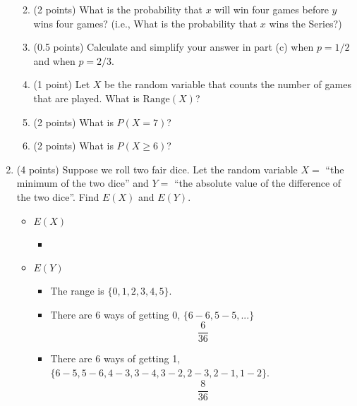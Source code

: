 \documentclass[11pt]{article}
\newcommand{\Range}{{\mathrm{Range}}}
\begin{document}
\begin{enumerate}
\begin{enumerate}
\begin{itemize}
	\end{itemize}
	
	\item (2 points) What is the probability that $x$ will win four games before
	$y$ wins four games?  (i.e., What is the probability that $x$ wins
	the Series?)
	
	
	
	\item (0.5 points) Calculate and simplify your answer in part (c) when $p=1/2$
	and when $p=2/3$.
	
	\item (1 point) Let $X$ be the random variable that counts the number of games
	that are played.  What is $\Range(X)$?
	
	\item (2 points) What is $P(X=7)$?
	
	\item (2 points) What is $P(X\geq 6)$?
\end{enumerate}

\item (4 points) Suppose we roll two fair dice.  Let the random variable $X=$
``the minimum of the two dice'' and $Y =$ ``the absolute value of the
difference of the two dice''.  Find $E(X)$ and $E(Y)$.

\begin{itemize}

	\item $E(X)$
	
	\begin{itemize}
	
		\item 
	
	\end{itemize}
	
	\item $E(Y)$

	\begin{itemize}
	
		\item The range is $\{0, 1, 2, 3, 4, 5\}$.
		\item There are 6 ways of getting 0, $\{6 - 6, 5 - 5, ...\}$
		      \[ \frac{6}{36} \]
		\item There are 6 ways of getting 1, $\{6 - 5, 5 - 6, 4 - 3, 3 - 4, 3 - 2, 2 - 3, 2 - 1, 1 - 2\}$.
		      \[ \frac{8}{36} \]
	
	\end{itemize}

\end{itemize}


\end{enumerate}
\end{document}

